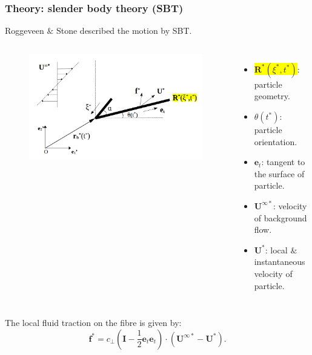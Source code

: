 \documentclass{beamer}
\newcommand{\bi}{\begin{itemize}}
\newcommand{\ei}{\end{itemize}}
\begin{document}
\begin{frame}
	\frametitle{Theory: slender body theory (SBT)}
	\begin{overlayarea}{\textwidth}{\textheight}
	\vspace{-0.5cm}\small Roggeveen $\&$ Stone described the motion by SBT. \normalsize 
		\begin{columns}
			\begin{figure}[htb]
				\begin{center}
					\includegraphics[width=1\textwidth]{plots/schematic/schematic_rigid_configuration_color1.png}
				\end{center}
			\end{figure}
			\small \bi 
			\item \colorbox{yellow}{$\mathbf{R}^*(\xi^*,t^*)$}: particle geometry.
			\item $\theta(t^*)$: particle orientation.
			\item $\mathbf{e}_t$: tangent to the surface of particle.
			\item $\mathbf{U}^{\infty*}$: velocity of background flow.
			\item $\mathbf{U}^*$: local $\&$ instantaneous velocity of particle.
			\ei
		\end{columns}\vspace{0.5cm}
		The local fluid traction on the fibre is given by: 
		\begin{equation*}
			\mathbf{f}^*=c_\perp\left(\mathbf{I}-\frac{1}{2}\mathbf{e}_t\mathbf{e}_t\right)\cdot(\mathbf{U}^{\infty*}-\mathbf{U}^*).
		\end{equation*}
	\end{overlayarea}
\end{frame}
\end{document}
